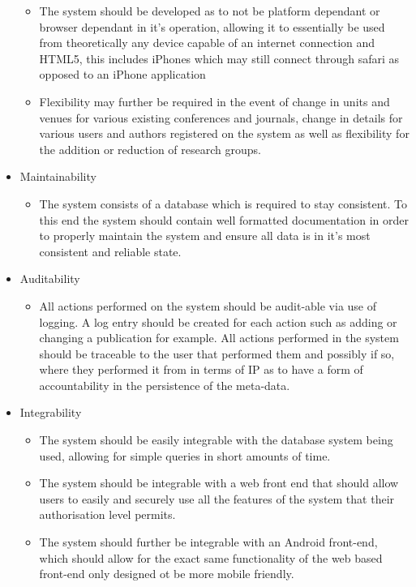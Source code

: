 \documentclass{article}
\begin{document}
\begin{itemize}
\begin{itemize}
			\item The system should be developed as to not be platform dependant or browser dependant in it's operation, allowing it to essentially be used from theoretically any device capable of an internet connection and HTML5, this includes iPhones which may still connect through safari as opposed to an iPhone application
			\item Flexibility may further be required in the event of change in units and venues for various existing conferences and journals, change in details for various users and authors registered on the system as well as flexibility for the addition or reduction of research groups.
		\end{itemize}
		\item Maintainability
		\begin{itemize}
			\item The system consists of a database which is required to stay consistent. To this end the system should contain well formatted documentation in order to properly maintain the system and ensure all data is in it's most consistent and reliable state.
		\end{itemize}
		\item Auditability
		\begin{itemize}
			\item All actions performed on the system should be audit-able via use of logging. A log entry should be created for each action such as adding or changing a publication for example. All actions performed in the system should be traceable to the user that performed them and possibly if so, where they performed it from in terms of IP as to have a form of accountability in the persistence of the meta-data.
		\end{itemize}
		\item Integrability
		\begin{itemize}
			\item The system should be easily integrable with the database system being used, allowing for simple queries in short amounts of time.
			\item The system should be integrable with a web front end that should allow users to easily and securely use all the features of the system that their authorisation level permits.
			\item The system should further be integrable with an Android front-end, which should allow for the exact same functionality of the web based front-end only designed ot be more mobile friendly.
		\end{itemize}

\end{itemize}
\end{document}
